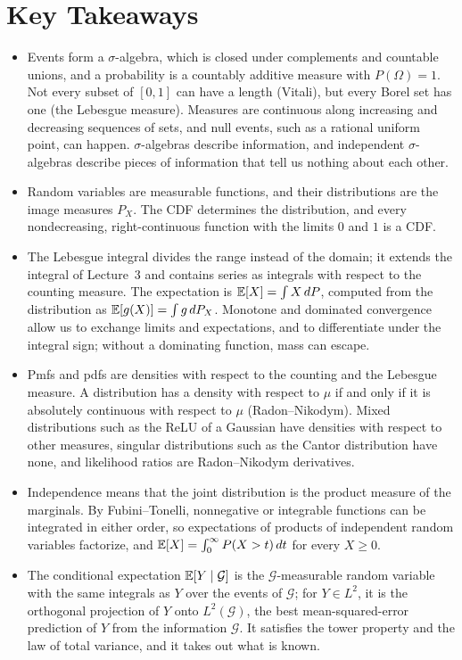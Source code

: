 \section*{Key Takeaways}
\begin{itemize}[leftmargin=*]
    \item Events form a $\sigma$-algebra, which is closed under complements and countable unions, and a probability is a countably additive measure with $P(\Omega) = 1$. Not every subset of $[0, 1]$ can have a length (Vitali), but every Borel set has one (the Lebesgue measure). Measures are continuous along increasing and decreasing sequences of sets, and null events, such as a rational uniform point, can happen. $\sigma$-algebras describe information, and independent $\sigma$-algebras describe pieces of information that tell us nothing about each other.
    \item Random variables are measurable functions, and their distributions are the image measures $P_X$. The CDF determines the distribution, and every nondecreasing, right-continuous function with the limits $0$ and $1$ is a CDF.
    \item The Lebesgue integral divides the range instead of the domain; it extends the integral of Lecture~3 and contains series as integrals with respect to the counting measure. The expectation is $\mathbb{E}[X] = \int X\, dP$, computed from the distribution as $\mathbb{E}[g(X)] = \int g\, dP_X$. Monotone and dominated convergence allow us to exchange limits and expectations, and to differentiate under the integral sign; without a dominating function, mass can escape.
    \item Pmfs and pdfs are densities with respect to the counting and the Lebesgue measure. A distribution has a density with respect to $\mu$ if and only if it is absolutely continuous with respect to $\mu$ (Radon--Nikodym). Mixed distributions such as the ReLU of a Gaussian have densities with respect to other measures, singular distributions such as the Cantor distribution have none, and likelihood ratios are Radon--Nikodym derivatives.
    \item Independence means that the joint distribution is the product measure of the marginals. By Fubini--Tonelli, nonnegative or integrable functions can be integrated in either order, so expectations of products of independent random variables factorize, and $\mathbb{E}[X] = \int_0^\infty P(X > t)\, dt$ for every $X \geq 0$.
    \item The conditional expectation $\mathbb{E}[Y \mid \mathcal{G}]$ is the $\mathcal{G}$-measurable random variable with the same integrals as $Y$ over the events of $\mathcal{G}$; for $Y \in L^2$, it is the orthogonal projection of $Y$ onto $L^2(\mathcal{G})$, the best mean-squared-error prediction of $Y$ from the information $\mathcal{G}$. It satisfies the tower property and the law of total variance, and it takes out what is known.

\end{itemize}
